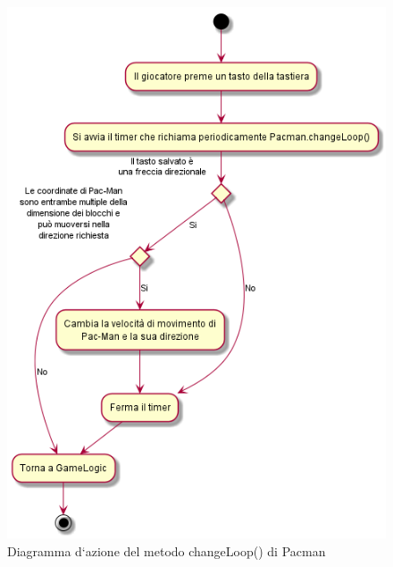 \documentclass[12pt,a4paper]{report}
\begin{document}
\begin{figure}[tbp]
\includegraphics[width=\textwidth,height=0.5\textheight,keepaspectratio]{pacman_changeLoop}
  \caption{Diagramma d`azione del metodo changeLoop() di Pacman}
  \label{fig:pacman_changeLoop}
\end{figure}
\end{document}
